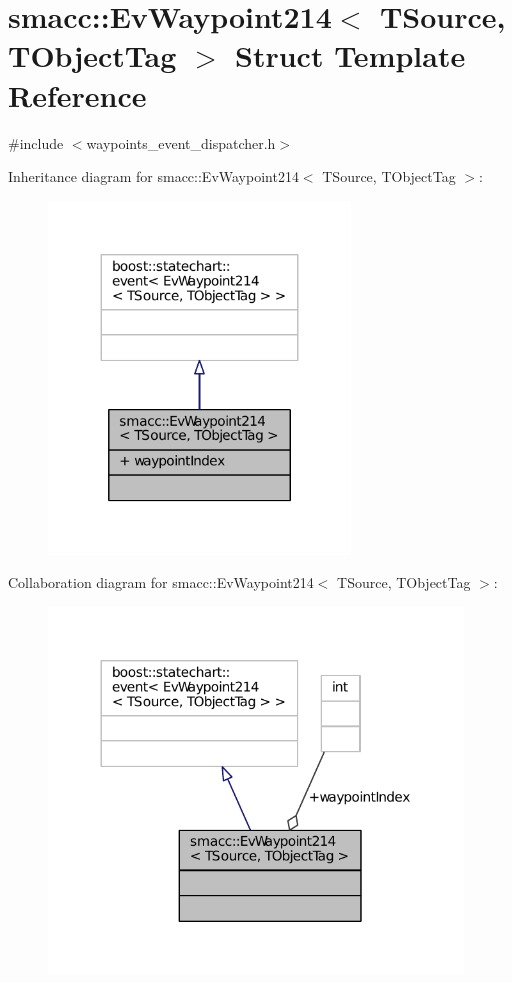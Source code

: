 \hypertarget{structsmacc_1_1EvWaypoint214}{}\section{smacc\+:\+:Ev\+Waypoint214$<$ T\+Source, T\+Object\+Tag $>$ Struct Template Reference}
\label{structsmacc_1_1EvWaypoint214}


{\ttfamily \#include $<$waypoints\+\_\+event\+\_\+dispatcher.\+h$>$}



Inheritance diagram for smacc\+:\+:Ev\+Waypoint214$<$ T\+Source, T\+Object\+Tag $>$\+:
\nopagebreak
\begin{figure}[H]
\begin{center}
\leavevmode
\includegraphics[width=227pt]{structsmacc_1_1EvWaypoint214__inherit__graph}
\end{center}
\end{figure}


Collaboration diagram for smacc\+:\+:Ev\+Waypoint214$<$ T\+Source, T\+Object\+Tag $>$\+:
\nopagebreak
\begin{figure}[H]
\begin{center}
\leavevmode
\includegraphics[width=312pt]{structsmacc_1_1EvWaypoint214__coll__graph}
\end{center}
\end{figure}
